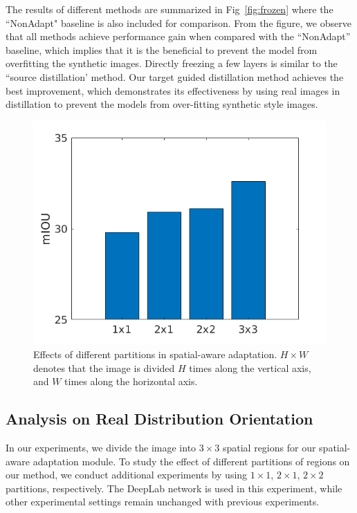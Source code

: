 \documentclass[10pt,twocolumn,letterpaper]{article}
\begin{document}
The results of different methods are summarized in Fig~\ref{fig:frozen} where the ``NonAdapt" baseline is also included for comparison. From the figure, we observe that all methods achieve performance gain when compared with the ``NonAdapt'' baseline, which implies that it is the beneficial to prevent the model from overfitting the synthetic images. Directly freezing a few layers is similar to the ``source distillation' method. Our target guided distillation method achieves the best improvement, which demonstrates its effectiveness by using real images in distillation to prevent the models from over-fitting synthetic style images. 

\begin{figure}
\centering
\includegraphics[width=0.7\linewidth]{fig_spatial.png}
\caption{Effects of different partitions in spatial-aware adaptation. $H\times W$ denotes that the image is divided $H$ times along the vertical axis, and $W$ times along the horizontal axis.}
\label{fig:spatial}
\vspace{-4mm}
\end{figure}

\subsection{Analysis on Real Distribution Orientation}
\label{sec:exp_rdo}
In our experiments, we divide the image into $3 \times 3$ spatial regions for our spatial-aware adaptation module. To study the effect of different partitions of regions on our method, we conduct additional experiments by using $1 \times 1$, $2\times 1$, $2\times 2$ partitions, respectively. The DeepLab network is used in this experiment, while other experimental settings remain unchanged with previous experiments. 
\end{document}
